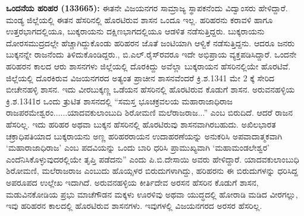 \textbf{ ಒಂದನೆಯ ಹರಿಹರ (133665):} ಈತನೇ ವಿಜಯನಗರ ಸಾಮ್ರಾಜ್ಯ ಸ್ಥಾಪಕನೆಂದು ವಿದ್ವಾಂಸರು ಹೇಳಿದ್ದಾರೆ. ಮಂಡ್ಯ ಜಿಲ್ಲೆಯಲ್ಲಿ ಈತನ ಹೆಸರಿನಲ್ಲಿ ಹೊರಟಿರುವ ಶಾಸನ ಒಂದೂ ಇಲ್ಲ. ಹರಿಹರನು ಕರಾವಳಿ ಹಾಗೂ ಉತ್ತರಭಾಗದಲ್ಲಿಯೂ, ಬುಕ್ಕರಾಯನು ದಕ್ಷಿಣಭಾಗದಲ್ಲಿಯೂ ಆಡಳಿತ ನಡೆಸುತ್ತಿದ್ದರು. ಬುಕ್ಕರಾಯನು ದೋರಸಮುದ್ರದಲ್ಲೇ ಹೆಚ್ಚಾಗಿದ್ದುಕೊಂಡು ಹರಿಹರನ ಜೊತೆ ಜಂಟಿಯಾಗಿ ಆಳ್ವಿಕೆ ನಡೆಸುತ್ತಿದ್ದನು. ಆದರೂ ಜನರು ಬುಕ್ಕನನ್ನೇ ರಾಜನೆಂದು ತಿಳಿದುಕೊಂಡಿದ್ದರು., ಬಿ.ಎಲ್​.ರೈಸ್​ರವರೂ ಇದೇ ಅಭಿಪ್ರಾಯ ವ್ಯಕ್ತಪಡಿಸಿದ್ದಾರೆ. ಒಂದನೇ ಹರಿಹರನ ಕಾಲದ ಆರು ಶಾಸನಗಳು ಜಿಲ್ಲೆಯಲ್ಲಿ ದೊರಕಿದ್ದು ಅವೆಲ್ಲಾ ಬುಕ್ಕರಾಯನ ಹೆಸರಿನಲ್ಲಿಯೇ ಹೊರಟಿವೆ. ಜಿಲ್ಲೆಯಲ್ಲಿ ದೊರಕಿರುವ ವಿಜಯನಗರದ ಅತ್ಯಂತ ಪ್ರಾಚೀನ ಶಾಸನವೆಂದರೆ ಕ್ರಿ.ಶ.1341 ಮೇ 2 ಕ್ಕೆ ಸೇರಿದ ಬೀಚೇನಹಳ್ಳಿ ಶಾಸನ. ಇದು ವೀರಬುಕ್ಕಣ್ಣ ಒಡೆಯನ ಹೆಸರಿನಲ್ಲಿ ಹೊರಟಿರುವ ಕೊಡುಗೆ ಶಾಸನ. ಅರುವನಹಳ್ಳಿಯ ಕ್ರಿ.ಶ.1341ರ ಒಂದು ತ್ರುಟಿತ ಶಾಸನದಲ್ಲಿ “ಸಮಸ್ತ ಭೂಚಕ್ರವಲಯ ಮಹಾರಾಜಾಧಿರಾಜ ರಾಜಪರಮೇಶ್ವರಂ......ಯಾದವಕುಲಾಂಬುದಿ ಶಿರೋಮಣಿ ಮಲೆರಾಜರಾಜ...” ಎಂಬ ಬಿರುದಿದೆ. ಆದರೆ ರಾಜನ ಹೆಸರಿಲ್ಲ. ಇದು ಹರಿಹರ ಅಥವಾ ಬುಕ್ಕನ ಹೆಸರಿನಲ್ಲಿ ಹೊರಟಿರುವು ಶಾಸನವಾಗಿರಬಹುದು. ಅಖಿಲಭಾರತ ಚಕ್ರಾಧಿಪತಿಯಾದ ಬುಕ್ಕರಾಯನು ಅಣ್ಣ ಹರಿಹರರಾಯನ ಉದಾಹರಣೆಯನ್ನು ಅನುಕರಿಸಿ ಅಪವಾದಾತ್ಮಕವಾಗಿ ‘ಮಹಾರಾಜಾಧಿರಾಜ’ ಎಂಬ ಪದವಿಯನ್ನು ಒಂದು ಬಾರಿ ಧರಿಸಿ ಪ್ರಾಮುಖ್ಯವಾಗಿ ‘ಮಹಾಮಂಡಲೇಶ್ವರ’ ಎಂದೆನಿಸಿಕೊಳ್ಳು\-ವುದರಲ್ಲಿಯೇ ತೃಪ್ತಿ ಪಡೆದನು” ಎಂದು ಪಿ.ಬಿ.ದೇಸಾಯಿ ಅವರು ಹೇಳಿದ್ದಾರೆ. ಯಾದವಕುಲಾಂಬುಧಿ ಶಿರೋಮಣಿ, ಮಲೆರಾಜರಾಜ ಎಂಬುದು ಹೊಯ್ಸಳರ ಬಿರುದುಗಳಾಗಿದ್ದು, ಹರಿಹರನು ಈ ಬಿರುದುಗಳನ್ನು ಧರಿಸಿದ್ದ ಅಪರೂಪದ ಉಲ್ಲೇಖ ಇದಾಗಿದೆ. ಅರುವನಹಳ್ಳಿಯ ಕೀರ್ತಿದೇವ ಅರಸನ ಹೆಸರಿನ ಕೊಡುಗೆ ಶಾಸನ, ಮಡುವಿನಕೋಡಿಯ ಪ್ರಭು ಮಾಚೆಗೌಡನ ಮಕ್ಕಳು ಊರಳಿವು ಅಥವಾ ಯುದ್ಧದಲ್ಲಿ ಹೋರಾಡಿ ಮಡಿದ ವೀರಗಲ್ಲು, ಇವು ಹರಿಹರನ ಕಾಲದಲ್ಲಿ ಹೊರಟಿರುವ ಶಾಸನಗಳು. ಇವುಗಳಲ್ಲಿ ವಿಜಯನಗರದ ಅರಸರ ಹೆಸರಿಲ್ಲ.

\vskip 3pt

